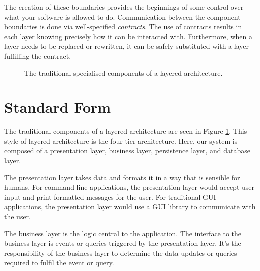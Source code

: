 The creation of these boundaries provides the beginnings of some control over what your software is allowed to do.
Communication between the component boundaries is done via well-specified \textsl{contracts}.
The use of contracts results in each layer knowing precisely how it can be interacted with.
Furthermore, when a layer needs to be replaced or rewritten, it can be safely substituted with a layer fulfilling the contract.


\begin{figure}[ht]
\centering
{}
\caption{The traditional specialised components of a layered architecture.}
\label{fig:traditional-layered}
\end{figure}

\section{Standard Form}

The traditional components of a layered architecture are seen in Figure \ref{fig:traditional-layered}.
This style of layered architecture is the four-tier architecture.
Here, our system is composed of a presentation layer, business layer, persistence layer, and database layer.

The presentation layer takes data and formats it in a way that is sensible for humans.
For command line applications, the presentation layer would accept user input and print formatted messages for the user.
For traditional GUI applications, the presentation layer would use a GUI library to communicate with the user.

The business layer is the logic central to the application.
The interface to the business layer is events or queries triggered by the presentation layer.
It's the responsibility of the business layer to determine the data updates or queries required to fulfil the event or query.

